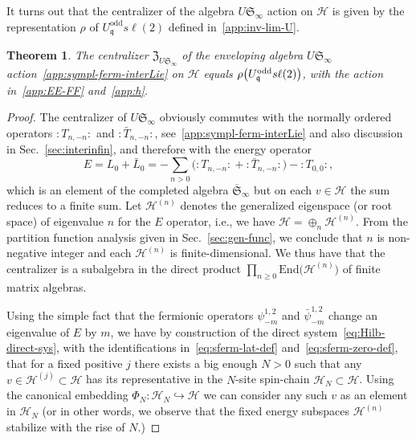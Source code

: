 \documentclass[11pt]{article}
\newcommand{\inj}{\hookrightarrow}
\newcommand{\strt}{T}
\newcommand{\bstrt}{\bar{\strt}}
\newcommand{\q}{\mathfrak{q}}
\newcommand{\LQGodd}{U^{\text{odd}}_{\q} s\ell(2)}
\newcommand{\sferm}{\psi}
\newcommand{\bsferm}{\bar{\psi}}
\newcommand{\Hilb}{\mathcal{H}}
\newcommand{\Endo}{\mathrm{End}}
\newcommand{\interLie}{\mathfrak{S}}
\newcommand{\interinfin}{\interLie_{\infty}}
\newcommand{\interinfinco}{\overline{\interLie}_{\infty}}
\newcommand{\cent}{\mathfrak{Z}}
\newcommand{\nord}[1]{\boldsymbol{\colon}\!\!{#1}\boldsymbol{\colon}\!\!}
\newtheorem{Thm}[subsection]{Theorem}
\theoremstyle{definition}
\begin{document}
\medskip

It turns out that the centralizer of the algebra $U \interinfin$ action  on $\Hilb$ is given by the representation $\rho$ of $\LQGodd$ defined in~\eqref{app:inv-lim-U}.

\begin{Thm}\label{thm:centr-interLie}
The centralizer $\cent_{U\interinfin}$ of the enveloping algebra $U\interinfin$ action~\eqref{app:sympl-ferm-interLie}
on $\Hilb$
 equals $\rodd$, with the action in~\eqref{app:EE-FF} and~\eqref{app:h}.
\end{Thm}
\begin{proof}
The centralizer of $U\interinfin$ obviously commutes with the normally ordered operators $\nord{\strt_{n,-n}}$ and $\nord{\bstrt_{n,-n}}$, see~\eqref{app:sympl-ferm-interLie} and also discussion in Sec.~\ref{sec:interinfin}, and therefore with the energy operator
\begin{equation*}
E=L_0+\bar{L}_0=-\sum_{n>0}\bigl(\nord{\strt_{n,-n}} + \nord{\bstrt_{n,-n}}\bigr) - \nord{\strt_{0,0}},
 \end{equation*}
which is an element of the completed algebra $\interinfinco$ but on each $v\in\Hilb$ the sum reduces to a finite sum. Let $\Hilb^{(n)}$ denotes the generalized eigenspace (or root space) of eigenvalue $n$ for the $E$ operator, i.e., we have $\Hilb=\oplus_{n}\Hilb^{(n)}$.
From the partition function analysis given in Sec.~\ref{sec:gen-func}, we conclude that $n$ is non-negative integer and each $\Hilb^{(n)}$ is finite-dimensional.
 We thus have that  the centralizer is a subalgebra in the direct product
$\prod_{n\geq 0} \Endo\bigl(\Hilb^{(n)}\bigr)$ of finite matrix algebras.

Using the simple fact that the fermionic operators $\sferm^{1,2}_{-m}$ and $\bsferm^{1,2}_{-m}$ change an eigenvalue of $E$
 by $m$,
we have by construction of the direct system~\eqref{eq:Hilb-direct-sys}, with the identifications in~\eqref{eq:sferm-lat-def} and~\eqref{eq:sferm-zero-def}, that for a fixed positive $j$ there exists a big enough $N>0$ such that any $v\in\Hilb^{(j)}\subset\Hilb$ has its representative in the $N$-site spin-chain $\Hilb_N\subset\Hilb$. Using the canonical embedding $\Phi_{N}:\Hilb_{N}\inj\Hilb$  we can consider any such $v$ as an element in $\Hilb_N$ (or in other words, we observe that the fixed energy subspaces $\Hilb^{(n)}$ stabilize with the rise of $N$.)



\end{proof}
\end{document}
